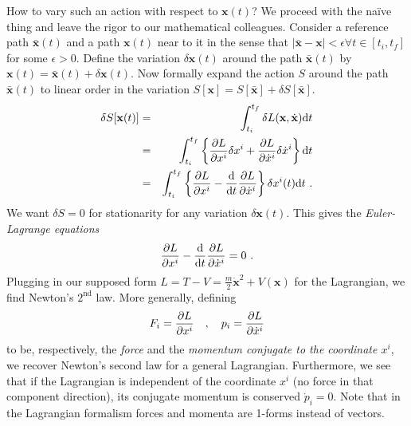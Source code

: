 \documentclass[12pt]{article}
\begin{document}
How to vary such an action with respect to $\mathbf x(t)$? We proceed with the na\"ive thing and leave the rigor to our mathematical colleagues. Consider a reference path $\bar {\mathbf x}(t)$ and a path $\mathbf x(t)$ near to it in the sense that $|\bar {\mathbf x}-\mathbf x|< \epsilon\forall t\in[t_i,t_f]$ for some $\epsilon>0$. Define the variation $\delta \mathbf x(t)$ around the path $\bar {\mathbf x}(t)$ by $\mathbf x(t)=\bar {\mathbf x}(t)+\delta \mathbf x(t)$. Now formally expand the action $S$ around the path $\bar {\mathbf x}(t)$ to linear order in the variation $S[\mathbf x]=S[\bar{\mathbf x}]+\delta S[\bar {\mathbf x}]$. 
\begin{eqnarray}
\delta S[\mathbf x(t)]&=&\int_{t_i}^{t_f} \delta L(\mathbf x, \dot {\mathbf x}) \mathrm d t\cr
&=&\int_{t_i}^{t_f} \left\{  {\partial L\over \partial x^i}\delta x^i+{\partial L\over \partial \dot x^i}\delta \dot x^i\right\} \mathrm d t\cr
&=&\int_{t_i}^{t_f} \left\{  {\partial L\over \partial x^i}-{\mathrm d\over \mathrm d t} {\partial L\over \partial \dot x^i}\right\} \delta x^i(t) \mathrm d t~.
\end{eqnarray}
We want $\delta S=0$ for stationarity for any variation $\delta \mathbf x(t)$. This gives the {\em Euler-Lagrange equations}
\begin{eqnarray}
{\partial L\over \partial x^i}-{\mathrm d\over \mathrm d t} {\partial L\over \partial \dot x^i}=0~.
\end{eqnarray}
Plugging in our supposed form $L=T-V=\frac m2 \dot {\mathbf x}^2+V(\mathbf x)$ for the Lagrangian, we find Newton's $2^\mathrm{nd}$ law. More generally, defining
\begin{eqnarray}
F_i={\partial L\over \partial x^i}~~~,~~~
p_i={\partial L\over \partial \dot x^i}
\end{eqnarray}
to be, respectively, the {\em force} and the {\em momentum conjugate to the coordinate $x^i$}, we recover Newton's second law for a general Lagrangian. Furthermore, we see that if the Lagrangian is independent of the coordinate $x^i$ (no force in that component direction), its conjugate momentum is conserved $\dot p_i=0$. Note that in the Lagrangian formalism forces and momenta are 1-forms instead of vectors. 

\end{document}

